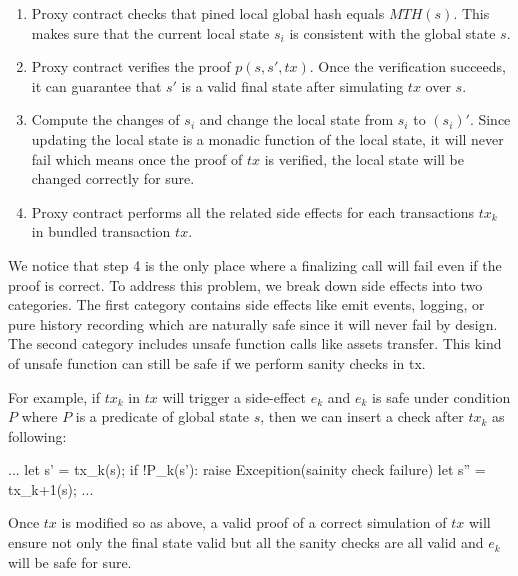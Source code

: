 \documentclass[pageno]{jpaper}
\newenvironment{code}%
   {\snugshade\verbatim}%
   {\endverbatim\endsnugshade}
\begin{document}
\begin{enumerate}[leftmargin=*]
\item Proxy contract checks that pined local global hash equals $MTH(s)$. This makes sure that the current local state $s_i$ is consistent with the global state $s$.

\item Proxy contract verifies the proof $p(s, s', tx)$. Once the verification succeeds, it can guarantee that $s'$ is a valid final state after simulating $tx$ over $s$.

\item Compute the changes of $s_i$ and change the local state from $s_i$ to $(s_i)'$. Since updating the local state is a monadic function of the local state, it will never fail which means once the proof of $tx$ is verified, the local state will be changed correctly for sure.

\item Proxy contract performs all the related side effects for each transactions $tx_k$ in bundled transaction $tx$. 
\end{enumerate}

We notice that step 4 is the only place where a finalizing call will fail even if the proof is correct. To address this problem, we break down side effects into two categories. The first category contains side effects like emit events, logging, or pure history recording which are naturally safe since it will never fail by design. The second category includes unsafe function calls like assets transfer. This kind of unsafe function can still be safe if we perform sanity checks in tx.

For example, if $tx_k$ in $tx$ will trigger a side-effect $e_k$ and $e_k$ is safe under condition $P$ where $P$ is a predicate of global state $s$, then we can insert a check after $tx_k$ as following:

\begin{code}
...
let s' = tx_k(s);
if !P_k(s'):
    raise Excepition(sainity check failure)
let s'' = tx_{k+1}(s);
...
\end{code}

Once $tx$ is modified so as above, a valid proof of a correct simulation of $tx$ will ensure not only the final state valid but all the sanity checks are all valid and $e_k$ will be safe for sure.
\end{document}
